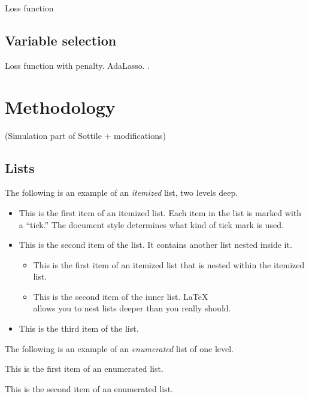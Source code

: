 \documentclass[aoas]{imsart}
\providecommand{\tightlist}{%
  \setlength{\itemsep}{0pt}\setlength{\parskip}{0pt}}
\numberwithin{equation}{section}
\theoremstyle{plain}
\theoremstyle{remark}
\begin{document}
Loss function

\hypertarget{variable-selection}{%
\subsection{Variable selection}\label{variable-selection}}

Loss function with penalty. AdaLasso. \citet{Konzen2016}.

\hypertarget{methodology}{%
\section{Methodology}\label{methodology}}

(Simulation part of Sottile + modifications)

\hypertarget{lists}{%
\subsection{Lists}\label{lists}}

The following is an example of an \emph{itemized} list, two levels deep.

\begin{itemize}
\tightlist
\item
  This is the first item of an itemized list. Each item in the list is
  marked with a ``tick.'' The document style determines what kind of
  tick mark is used.
\item
  This is the second item of the list. It contains another list nested
  inside it.

  \begin{itemize}
  \tightlist
  \item
    This is the first item of an itemized list that is nested within the
    itemized list.
  \item
    This is the second item of the inner list. \LaTeX\\
    allows you to nest lists deeper than you really should.
  \end{itemize}
\item
  This is the third item of the list.
\end{itemize}

The following is an example of an \emph{enumerated} list of one level.

\begin{longlist}
\item This is the first item of an enumerated list.
\item This is the second item of an enumerated list.
\end{longlist}
\end{document}
